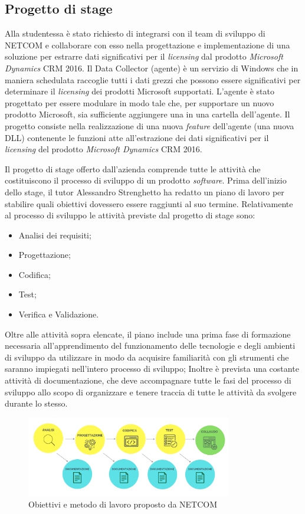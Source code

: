 \subsection{Progetto di stage}
Alla studentessa è stato richiesto di integrarsi con il team di sviluppo di NETCOM e collaborare con esso nella progettazione e implementazione di una soluzione per estrarre dati significativi per il \emph{licensing} dal prodotto \emph{Microsoft Dynamics} CRM 2016.
Il Data Collector (agente) è un servizio di Windows che in maniera schedulata
raccoglie tutti i dati grezzi che possono essere significativi per determinare il \emph{licensing} dei prodotti Microsoft supportati.
L'agente è stato progettato per essere modulare in modo tale che, per supportare un nuovo prodotto Microsoft, sia sufficiente aggiungere una  in una cartella dell'agente.
Il progetto consiste nella realizzazione di una nuova \emph{feature} dell'agente (una nuova DLL) contenente le funzioni atte all'estrazione dei dati significativi per il \emph{licensing} del prodotto \emph{Microsoft Dynamics} CRM 2016.

Il progetto di stage offerto dall’azienda comprende tutte le attività che costituiscono il processo di sviluppo di un prodotto \emph{software}. Prima dell’inizio dello stage, il tutor Alessandro Strenghetto ha redatto un piano di lavoro per stabilire quali obiettivi dovessero essere raggiunti al suo termine. Relativamente al processo di sviluppo le attività previste dal progetto di stage sono:
\begin{itemize}
    \item Analisi dei requisiti;
    \item Progettazione;
    \item Codifica;
    \item Test;
    \item Verifica e Validazione.
\end{itemize}
Oltre alle attività sopra elencate, il piano include una prima fase di formazione necessaria all’apprendimento del funzionamento delle tecnologie e degli ambienti di sviluppo da utilizzare in modo da acquisire familiarità con gli strumenti che saranno impiegati nell’intero processo di sviluppo;
Inoltre è prevista una costante attività di documentazione, che deve accompagnare tutte le fasi del processo di sviluppo allo scopo di organizzare e tenere traccia di tutte le attività da svolgere durante lo stesso.\\
     \begin{figure}[H]
        \centering
        \captionsetup{justification=centering,margin=2cm}
            \includegraphics[width=0.8\textwidth ]{figures/pianolavoro.png}
            \caption [Obiettivi e metodo di lavoro NETCOM]{Obiettivi e metodo di lavoro proposto da NETCOM \label{fig:pianolavoro}}
    \end{figure}
